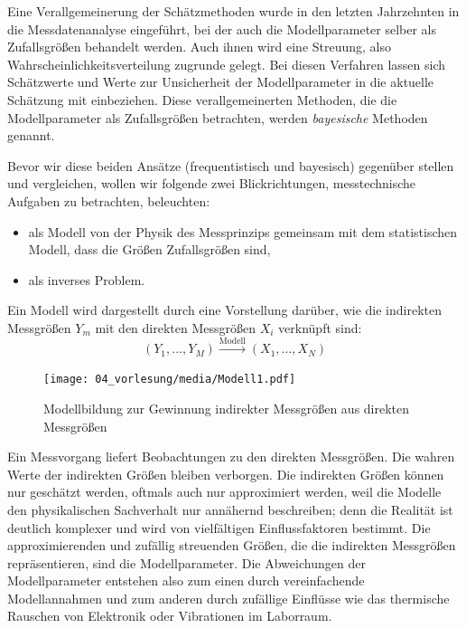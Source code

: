 Eine Verallgemeinerung der Schätzmethoden wurde in den letzten Jahrzehnten
in die Messdatenanalyse eingeführt, bei der auch die Modellparameter selber als
Zufallsgrößen behandelt werden. Auch ihnen wird eine Streuung, also
Wahrscheinlichkeitsverteilung zugrunde gelegt. Bei diesen Verfahren lassen sich
Schätzwerte und Werte zur Unsicherheit der Modellparameter in die aktuelle
Schätzung mit einbeziehen. Diese verallgemeinerten Methoden, die die Modellparameter
als Zufallsgrößen betrachten, werden \textsl{bayesische} Methoden genannt.

Bevor wir diese beiden Ansätze (frequentistisch und bayesisch) gegenüber
stellen und vergleichen, wollen wir folgende
zwei Blickrichtungen, messtechnische Aufgaben zu betrachten, beleuchten:
\begin{itemize}
\item als Modell von der Physik des Messprinzips gemeinsam mit dem statistischen
Modell, dass die Größen Zufallsgrößen sind,
\item als inverses Problem.
\end{itemize}
Ein Modell wird dargestellt durch eine Vorstellung darüber, wie die
indirekten Messgrößen $Y_m$ mit den direkten Messgrößen $X_i$ verknüpft sind:
\begin{equation}
(Y_1, \dots, Y_M) \xrightarrow{\mathrm{Modell}} (X_1, \dots, X_N)
\label{forwardModel1}
\end{equation}
\begin{figure}
\begin{center}
\texttt{[image: 04\_vorlesung/media/Modell1.pdf]}
\end{center}
\caption{Modellbildung zur Gewinnung indirekter Messgrößen aus direkten Messgrößen}
\end{figure}

Ein Messvorgang liefert Beobachtungen zu den direkten Messgrößen.
Die wahren Werte der indirekten Größen bleiben verborgen. Die
indirekten Größen können nur geschätzt werden, oftmals auch nur approximiert werden,
weil die Modelle den physikalischen Sachverhalt nur annähernd beschreiben;
denn die Realität ist deutlich komplexer und wird von vielfältigen Einflussfaktoren
bestimmt. Die approximierenden und zufällig streuenden Größen, die die indirekten Messgrößen
repräsentieren, sind die Modellparameter.
Die Abweichungen der Modellparameter entstehen also zum einen
durch vereinfachende Modellannahmen und zum anderen durch zufällige Einflüsse wie das
thermische Rauschen von Elektronik oder Vibrationen im Laborraum.

